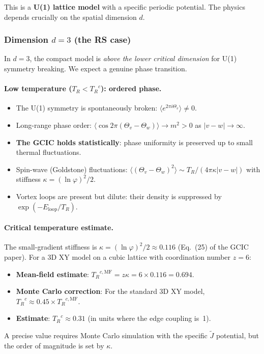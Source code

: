 \documentclass[11pt]{article}
\theoremstyle{definition}
\newcommand{\Jtilde}{\tilde{J}}
\newcommand{\TR}{{T_R}}
\newcommand{\phig}{\varphi}
\begin{document}
This is a \textbf{U(1) lattice model} with a specific periodic potential. The physics depends crucially on the spatial dimension $d$.

\subsubsection{Dimension $d = 3$ (the RS case)}

In $d = 3$, the compact model is \emph{above the lower critical dimension} for U(1) symmetry breaking. We expect a genuine phase transition.

\paragraph{Low temperature ($\TR < \TR^c$): ordered phase.}
\begin{itemize}[nosep]
\item The U(1) symmetry is spontaneously broken: $\langle e^{2\pi i \Theta_v}\rangle \neq 0$.
\item Long-range phase order: $\langle \cos 2\pi(\Theta_v - \Theta_w)\rangle \to m^2 > 0$ as $|v-w| \to \infty$.
\item \textbf{The GCIC holds statistically}: phase uniformity is preserved up to small thermal fluctuations.
\item Spin-wave (Goldstone) fluctuations: $\langle (\Theta_v - \Theta_w)^2 \rangle \sim \TR/(4\pi\kappa |v-w|)$ with stiffness $\kappa = (\ln\phig)^2/2$.
\item Vortex loops are present but dilute: their density is suppressed by $\exp(-E_{\mathrm{loop}}/\TR)$.
\end{itemize}

\paragraph{Critical temperature estimate.}
The small-gradient stiffness is $\kappa = (\ln\phig)^2/2 \approx 0.116$ (Eq.~(25) of the GCIC paper). For a 3D XY model on a cubic lattice with coordination number $z = 6$:

\begin{itemize}[nosep]
\item \textbf{Mean-field estimate}: $\TR^{c,\mathrm{MF}} = z\kappa = 6 \times 0.116 = 0.694$.
\item \textbf{Monte Carlo correction}: For the standard 3D XY model, $\TR^c \approx 0.45 \times \TR^{c,\mathrm{MF}}$.
\item \textbf{Estimate}: $\TR^c \approx 0.31$ (in units where the edge coupling is~1).
\end{itemize}
A precise value requires Monte Carlo simulation with the specific $\Jtilde$ potential, but the order of magnitude is set by $\kappa$.
\end{document}

